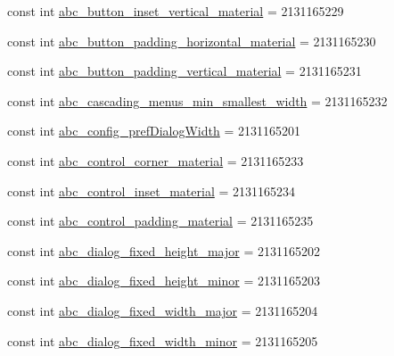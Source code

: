 \begin{DoxyCompactItemize}
\item 
const int \mbox{\hyperlink{class_f_w_p_s___app_1_1_droid_1_1_resource_1_1_dimension_a69fd068768d63aab77315f2541049ffe}{abc\+\_\+button\+\_\+inset\+\_\+vertical\+\_\+material}} = 2131165229
\item 
const int \mbox{\hyperlink{class_f_w_p_s___app_1_1_droid_1_1_resource_1_1_dimension_a85dcdd1286ccd10bbde73c01513ce25f}{abc\+\_\+button\+\_\+padding\+\_\+horizontal\+\_\+material}} = 2131165230
\item 
const int \mbox{\hyperlink{class_f_w_p_s___app_1_1_droid_1_1_resource_1_1_dimension_a40f66490b4433961ffb4a92ad92ab4a9}{abc\+\_\+button\+\_\+padding\+\_\+vertical\+\_\+material}} = 2131165231
\item 
const int \mbox{\hyperlink{class_f_w_p_s___app_1_1_droid_1_1_resource_1_1_dimension_a08830f23a0ce6d93283cca1674901ec9}{abc\+\_\+cascading\+\_\+menus\+\_\+min\+\_\+smallest\+\_\+width}} = 2131165232
\item 
const int \mbox{\hyperlink{class_f_w_p_s___app_1_1_droid_1_1_resource_1_1_dimension_a1c65e2b7bf380afa0a4ffc712fe58cce}{abc\+\_\+config\+\_\+pref\+Dialog\+Width}} = 2131165201
\item 
const int \mbox{\hyperlink{class_f_w_p_s___app_1_1_droid_1_1_resource_1_1_dimension_a2e2fd2fa28d8945f7bcb993ed60d2f8a}{abc\+\_\+control\+\_\+corner\+\_\+material}} = 2131165233
\item 
const int \mbox{\hyperlink{class_f_w_p_s___app_1_1_droid_1_1_resource_1_1_dimension_ac3cb263c6d211b75d7b81538bdc7b4b3}{abc\+\_\+control\+\_\+inset\+\_\+material}} = 2131165234
\item 
const int \mbox{\hyperlink{class_f_w_p_s___app_1_1_droid_1_1_resource_1_1_dimension_a0e33630908fab86a535f64ae40646372}{abc\+\_\+control\+\_\+padding\+\_\+material}} = 2131165235
\item 
const int \mbox{\hyperlink{class_f_w_p_s___app_1_1_droid_1_1_resource_1_1_dimension_a8d4c9ade5ec8a86807256fdef941fc4d}{abc\+\_\+dialog\+\_\+fixed\+\_\+height\+\_\+major}} = 2131165202
\item 
const int \mbox{\hyperlink{class_f_w_p_s___app_1_1_droid_1_1_resource_1_1_dimension_ae7cf37703c34603f90dc3ebffbf3fa47}{abc\+\_\+dialog\+\_\+fixed\+\_\+height\+\_\+minor}} = 2131165203
\item 
const int \mbox{\hyperlink{class_f_w_p_s___app_1_1_droid_1_1_resource_1_1_dimension_a86b3ea126c28b82ce7760a1ee565447c}{abc\+\_\+dialog\+\_\+fixed\+\_\+width\+\_\+major}} = 2131165204
\item 
const int \mbox{\hyperlink{class_f_w_p_s___app_1_1_droid_1_1_resource_1_1_dimension_ae87e00410900691827df845700ef0b5e}{abc\+\_\+dialog\+\_\+fixed\+\_\+width\+\_\+minor}} = 2131165205

\end{DoxyCompactItemize}
